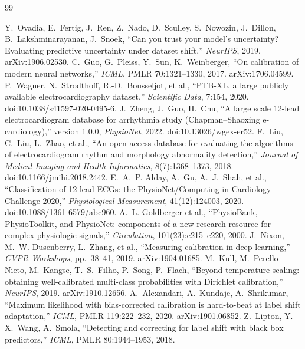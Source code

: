 \documentclass[final,5p,times,nonatbib]{elsarticle}
\begin{document}
\begin{thebibliography}{99}
\raggedright
 Y.~Ovadia, E.~Fertig, J.~Ren, Z.~Nado,
D.~Sculley, S.~Nowozin, J.~Dillon, B.~Lakshminarayanan, J.~Snoek,
``Can you trust your model's uncertainty? Evaluating predictive
uncertainty under dataset shift,'' \emph{NeurIPS}, 2019.
arXiv:1906.02530.
 C.~Guo, G.~Pleiss, Y.~Sun, K.~Weinberger,
``On calibration of modern neural networks,'' \emph{ICML}, PMLR
70:1321--1330, 2017. arXiv:1706.04599.
 P.~Wagner, N.~Strodthoff, R.-D.~Bousseljot,
et al., ``PTB-XL, a large publicly available electrocardiography
dataset,'' \emph{Scientific Data}, 7:154, 2020.
doi:10.1038/s41597-020-0495-6.
 J.~Zheng, J.~Guo, H.~Chu,
``A large scale 12-lead electrocardiogram database for arrhythmia
study (Chapman--Shaoxing e-cardiology),'' version 1.0.0,
\emph{PhysioNet}, 2022. doi:10.13026/wgex-er52.
 F.~Liu, C.~Liu, L.~Zhao, et al., ``An open
access database for evaluating the algorithms of electrocardiogram
rhythm and morphology abnormality detection,'' \emph{Journal of
Medical Imaging and Health Informatics}, 8(7):1368--1373, 2018.
doi:10.1166/jmihi.2018.2442.
 E.~A.~P. Alday, A.~Gu, A.~J.~Shah, et al.,
``Classification of 12-lead ECGs: the PhysioNet/Computing in
Cardiology Challenge 2020,'' \emph{Physiological Measurement},
41(12):124003, 2020. doi:10.1088/1361-6579/abc960.
 A.~L. Goldberger et al., ``PhysioBank,
PhysioToolkit, and PhysioNet: components of a new research resource
for complex physiologic signals,'' \emph{Circulation},
101(23):e215--e220, 2000.
 J.~Nixon, M.~W. Dusenberry, L.~Zhang, et al.,
``Measuring calibration in deep learning,'' \emph{CVPR Workshops},
pp.~38--41, 2019. arXiv:1904.01685.
 M.~Kull, M.~Perello-Nieto, M.~Kangse,
T.~S.~Filho, P.~Song, P.~Flach, ``Beyond temperature scaling:
obtaining well-calibrated multi-class probabilities with Dirichlet
calibration,'' \emph{NeurIPS}, 2019. arXiv:1910.12656.
 A.~Alexandari, A.~Kundaje, A.~Shrikumar,
``Maximum likelihood with bias-corrected calibration is hard-to-beat
at label shift adaptation,'' \emph{ICML}, PMLR 119:222--232, 2020.
arXiv:1901.06852.
 Z.~Lipton, Y.-X.~Wang, A.~Smola,
``Detecting and correcting for label shift with black box
predictors,'' \emph{ICML}, PMLR 80:1944--1953, 2018.

\end{thebibliography}
\end{document}
